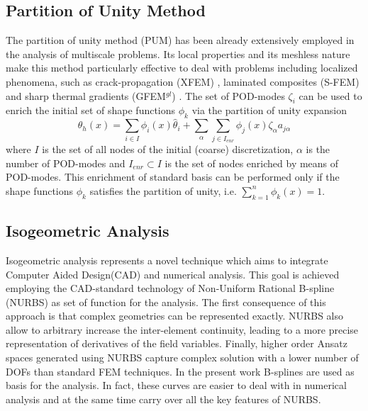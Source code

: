 \documentclass[3p]{article}
\begin{document}
\subsection*{Partition of Unity Method}
The partition of unity method (PUM) \cite{Babuska1997} has been already extensively employed in the analysis of multiscale problems. Its local properties and its meshless nature make this method particularly effective to deal with problems including localized phenomena, such as crack-propagation (XFEM) \cite{Moes2002}, laminated composites (S-FEM)\cite{fish_s-version_1996} and sharp thermal gradients (GFEM$^{gl}$) \cite{Ohara2013}.
The set of POD-modes $\zeta_{i}$ can be used to enrich the initial set of shape functions $\phi_{k}$ via the partition of unity expansion 
\begin{equation}
\theta_{h}(x) = \sum_{i\in I} \phi_{i}(x)\hat{\theta}_{i} + \sum_{\alpha}\sum_{j\in I_{enr}} \phi_{j}(x)\zeta_{\alpha}a_{j\alpha}
\label{PartitionOfUnity}
\end{equation}
where $I$ is the set of all nodes of the initial (coarse) discretization, $\alpha$ is the number of POD-modes and $I_{enr}\subset I$ is the set of nodes enriched by means of POD-modes. This enrichment of standard basis can be performed only if the shape functions $\phi_{k}$ satisfies the partition of unity, i.e. $\sum_{k=1}^{n}\phi_{k}(x)=1$. 


\subsection*{Isogeometric Analysis}
Isogeometric analysis represents a novel technique which aims to integrate Computer Aided Design(CAD) and numerical analysis. This goal is achieved employing the CAD-standard technology of Non-Uniform Rational B-spline (NURBS) \cite{Piegl1997} as set of function for the analysis. The first consequence of this approach is that complex geometries can be represented exactly. NURBS also allow to arbitrary increase the inter-element continuity, leading to a more precise representation of derivatives of the field variables. Finally, higher order Ansatz spaces generated using NURBS capture complex solution with a lower number of DOFs than standard FEM techniques.
In the present work B-splines are used as basis for the analysis. In fact, these curves are easier to deal with in numerical analysis and at the same time carry over all the key features of NURBS.
\end{document}
